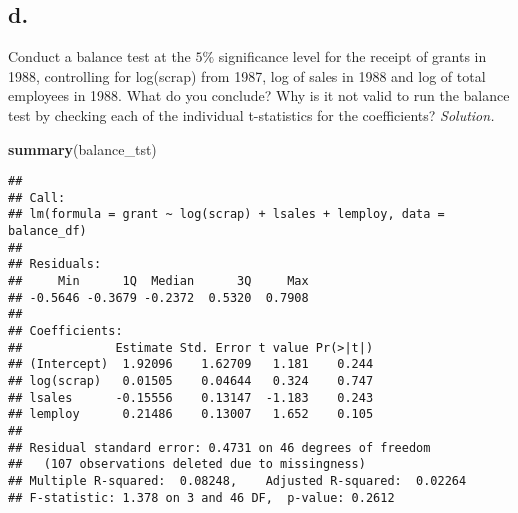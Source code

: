 \documentclass[
]{article}
\newenvironment{Shaded}{\begin{snugshade}}{\end{snugshade}}
\newcommand{\DataTypeTok}[1]{\textcolor[rgb]{0.13,0.29,0.53}{#1}}
\newcommand{\DecValTok}[1]{\textcolor[rgb]{0.00,0.00,0.81}{#1}}
\newcommand{\KeywordTok}[1]{\textcolor[rgb]{0.13,0.29,0.53}{\textbf{#1}}}
\newcommand{\NormalTok}[1]{#1}
\newcommand{\OperatorTok}[1]{\textcolor[rgb]{0.81,0.36,0.00}{\textbf{#1}}}
\newcommand{\StringTok}[1]{\textcolor[rgb]{0.31,0.60,0.02}{#1}}
\begin{document}
\hypertarget{d.}{%
\subsection{d.~}\label{d.}}

Conduct a balance test at the \(5\%\) significance level for the receipt
of grants in 1988, controlling for log(scrap) from 1987, log of sales in
1988 and log of total employees in 1988. What do you conclude? Why is it
not valid to run the balance test by checking each of the individual
t-statistics for the coefficients? \newline \newline \newpage
\emph{Solution.}

\begin{Shaded}
\end{Shaded}

\begin{Shaded}
\begin{Highlighting}[]
\KeywordTok{summary}\NormalTok{(balance_tst)}
\end{Highlighting}
\end{Shaded}

\begin{verbatim}
## 
## Call:
## lm(formula = grant ~ log(scrap) + lsales + lemploy, data = balance_df)
## 
## Residuals:
##     Min      1Q  Median      3Q     Max 
## -0.5646 -0.3679 -0.2372  0.5320  0.7908 
## 
## Coefficients:
##             Estimate Std. Error t value Pr(>|t|)
## (Intercept)  1.92096    1.62709   1.181    0.244
## log(scrap)   0.01505    0.04644   0.324    0.747
## lsales      -0.15556    0.13147  -1.183    0.243
## lemploy      0.21486    0.13007   1.652    0.105
## 
## Residual standard error: 0.4731 on 46 degrees of freedom
##   (107 observations deleted due to missingness)
## Multiple R-squared:  0.08248,    Adjusted R-squared:  0.02264 
## F-statistic: 1.378 on 3 and 46 DF,  p-value: 0.2612
\end{verbatim}
\end{document}
